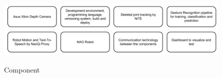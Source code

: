 \begin{figure}
	[h] \centering 
	\includegraphics[height=35mm]{figures/content/hri-components.png} \caption{Component} \label{fg:hri:components} 
\end{figure}
